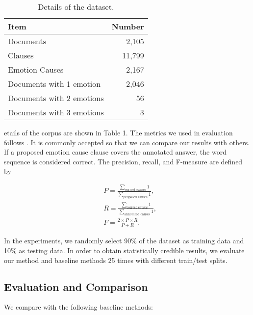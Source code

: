 \documentclass[11pt,letterpaper]{article}
\begin{document}
\begin{CJK*}{UTF8}{gbsn}
\begin{table}
\centering
\small
\begin{tabular}{|l|r|}
\hline
{\bf Item} & {\bf Number} \\\hline
Documents & 2,105 \\
Clauses & 11,799 \\
Emotion Causes & 2,167 \\ 
Documents with 1 emotion & 2,046 \\ 
Documents with 2 emotions & 56 \\
Documents with 3 emotions  & 3  \\\hline
\end{tabular} 
\caption{Details of the dataset.}
\end{table}


etails of the corpus are shown in Table 1. The metrics we used in evaluation follows . It is commonly accepted so that we can compare our results with others. If a proposed emotion cause clause covers the annotated answer, the word sequence is considered correct. The precision, recall, and F-measure are defined by

\begin{align*}
&P=\frac{\sum_{\mbox{correct causes}} 1}{\sum_{\mbox{proposed causes}} 1}, \\
&R=\frac{\sum_{\mbox{correct causes}} 1}{\sum_{\mbox{annotated causes}} 1}, \\
&F=\frac{2 \times P \times R}{P+R}.
\end{align*}

In the experiments, we randomly select 90\% of the dataset as training data and 10\% as testing data. In order to obtain statistically credible results, we evaluate our method and baseline methods 25 times with different train/test splits.

\subsection{Evaluation and Comparison}

We compare with the following baseline methods:


\end{CJK*}
\end{document}
